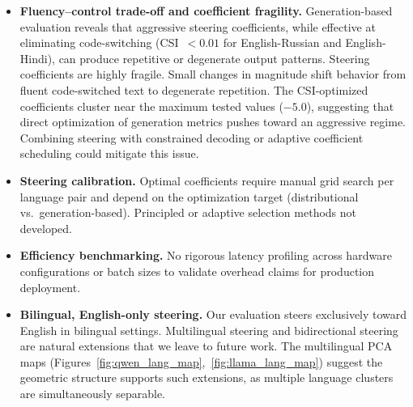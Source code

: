 \begin{itemize}
  \item \textbf{Fluency--control trade-off and coefficient fragility.} Generation-based evaluation reveals that aggressive steering coefficients, while effective at eliminating code-switching (CSI~$< 0.01$ for English-Russian and English-Hindi), can produce repetitive or degenerate output patterns. Steering coefficients are highly fragile. Small changes in magnitude shift behavior from fluent code-switched text to degenerate repetition. The CSI-optimized coefficients cluster near the maximum tested values ($-5.0$), suggesting that direct optimization of generation metrics pushes toward an aggressive regime. Combining steering with constrained decoding or adaptive coefficient scheduling could mitigate this issue.

  \item \textbf{Steering calibration.} Optimal coefficients require manual grid search per language pair and depend on the optimization target (distributional vs.\ generation-based). Principled or adaptive selection methods not developed.

  \item \textbf{Efficiency benchmarking.} No rigorous latency profiling across hardware configurations or batch sizes to validate overhead claims for production deployment.

  \item \textbf{Bilingual, English-only steering.} Our evaluation steers exclusively toward English in bilingual settings. Multilingual steering and bidirectional steering are natural extensions that we leave to future work. The multilingual PCA maps (Figures~\ref{fig:qwen_lang_map},~\ref{fig:llama_lang_map}) suggest the geometric structure supports such extensions, as multiple language clusters are simultaneously separable.
\end{itemize}